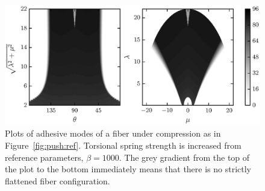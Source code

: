 {	\begin{figure}[t]
		\begin{center}
			\includegraphics{./fig/ch3/push/b1000/grid.eps}
		\end{center}	
		\caption{Plots of adhesive modes of a fiber under compression as in Figure~\ref{fig:push:ref}. Torsional spring strength is increased from reference parameters, $\beta=1000$. The grey gradient from the top of the plot to the bottom immediately means that there is no strictly flattened fiber configuration.
		\label{fig:push:b1000}}
	\end{figure}
	
}

